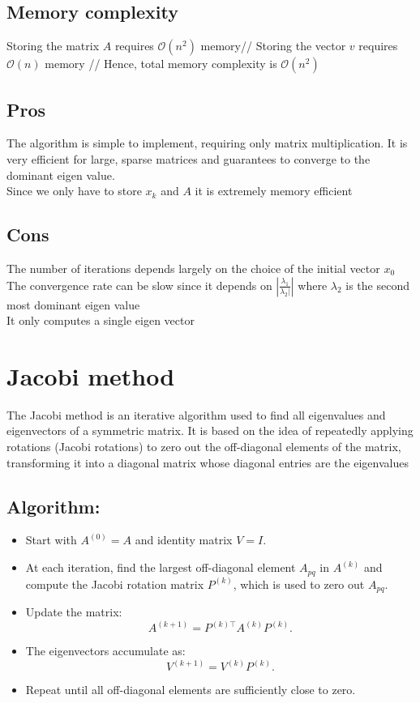 \documentclass[final]{article}
\begin{document}
        \subsection{Memory complexity}
        Storing the matrix $A$ requires $\mathcal{O}(n^2)$ memory//
        Storing the vector $v$ requires $\mathcal{O}(n)$ memory //
        Hence, total memory complexity is $\mathcal{O}(n^2)$

        \subsection{Pros} 
        The algorithm is simple to implement, requiring only matrix multiplication. It is very efficient for large, sparse matrices and guarantees to converge to the dominant eigen value. \\
        Since we only have to store $x_k$ and $A$ it is extremely memory efficient \\
        \subsection{Cons} 
        The number of iterations depends largely on the choice of the initial vector $x_0$ \\ 
        The convergence rate can be slow since it depends on $|\frac{\lambda_1}{\lambda_2|}|$ where $\lambda_2$ is the second most dominant eigen value \\ 
        It only computes a single eigen vector
    \section{Jacobi method}
    The Jacobi method is an iterative algorithm used to find all eigenvalues and eigenvectors of a symmetric matrix. It is based on the idea of repeatedly applying rotations (Jacobi rotations) to zero out the off-diagonal elements of the matrix, transforming it into a diagonal matrix whose diagonal entries are the eigenvalues
        \subsection{Algorithm:}
\begin{itemize}
    \item Start with $A^{(0)} = A$ and identity matrix $V = I$.
    \item At each iteration, find the largest off-diagonal element $A_{pq}$ in $A^{(k)}$ and compute the Jacobi rotation matrix $P^{(k)}$, which is used to zero out $A_{pq}$.
    \item Update the matrix: 
    \[
    A^{(k+1)} = P^{(k)\top} A^{(k)} P^{(k)}.
    \]
    \item The eigenvectors accumulate as:
    \[
    V^{(k+1)} = V^{(k)} P^{(k)}.
    \]
    \item Repeat until all off-diagonal elements are sufficiently close to zero.
\end{itemize}
\end{document}
